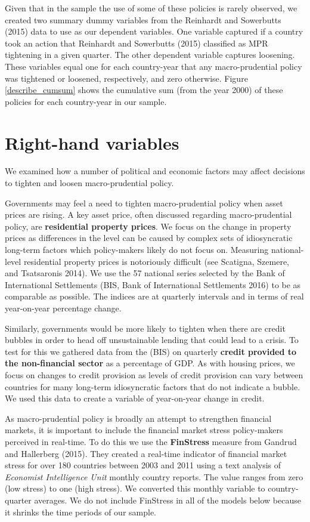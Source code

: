 \documentclass[]{article}
\begin{document}
Given that in the sample the use of some of these policies is rarely
observed, we created two summary dummy variables from the Reinhardt and
Sowerbutts (2015) data to use as our dependent variables. One variable
captured if a country took an action that Reinhardt and Sowerbutts
(2015) classified as MPR tightening in a given quarter. The other
dependent variable captures loosening. These variables equal one for
each country-year that any macro-prudential policy was tightened or
loosened, respectively, and zero otherwise. Figure \ref{describe_cumsum}
shows the cumulative sum (from the year 2000) of these policies for each
country-year in our sample.

\section{Right-hand variables}\label{right-hand-variables}

We examined how a number of political and economic factors may affect
decisions to tighten and loosen macro-prudential policy.

Governments may feel a need to tighten macro-prudential policy when
asset prices are rising. A key asset price, often discussed regarding
macro-prudential policy, are \textbf{residential property prices}. We
focus on the change in property prices as differences in the level can
be caused by complex sets of idiosyncratic long-term factors which
policy-makers likely do not focus on. Measuring national-level
residential property prices is notoriously difficult (see Scatigna,
Szemere, and Tsatsaronis 2014). We use the 57 national series selected
by the Bank of International Settlements (BIS, Bank of International
Settlements 2016) to be as comparable as possible. The indices are at
quarterly intervals and in terms of real year-on-year percentage change.

Similarly, governments would be more likely to tighten when there are
credit bubbles in order to head off unsustainable lending that could
lead to a crisis. To test for this we gathered data from the (BIS) on
quarterly \textbf{credit provided to the non-financial sector} as a
percentage of GDP. As with housing prices, we focus on changes to credit
provision as levels of credit provision can vary between countries for
many long-term idiosyncratic factors that do not indicate a bubble. We
used this data to create a variable of year-on-year change in credit.

As macro-prudential policy is broadly an attempt to strengthen financial
markets, it is important to include the financial market stress
policy-makers perceived in real-time. To do this we use the
\textbf{FinStress} measure from Gandrud and Hallerberg (2015). They
created a real-time indicator of financial market stress for over 180
countries between 2003 and 2011 using a text analysis of \emph{Economist
Intelligence Unit} monthly country reports. The value ranges from zero
(low stress) to one (high stress). We converted this monthly variable to
country-quarter averages. We do not include FinStress in all of the
models below because it shrinks the time periods of our sample.
\end{document}
